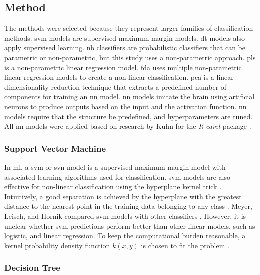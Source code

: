 \let\LaTeXcline\cline\documentclass[sn-mathphys-num]{sn-jnl}\let\cline\LaTeXcline
\begin{document}
\subsection{Method}

The methods were selected because they represent larger families of classification methods. \acrshort{svm} models are supervised maximum margin models. \acrshort{dt} models also apply supervised learning. \acrshort{nb} classifiers are probabilistic classifiers that can be parametric or non-parametric, but this study uses a non-parametric approach. \acrshort{pls} is a non-parametric linear regression model. \acrshort{fda} uses multiple non-parametric linear regression models to create a non-linear classification. \acrshort{pca} is a linear dimensionality reduction technique that extracts a predefined number of components for training an \acrshort{nn} model. \acrshort{nn} models imitate the brain using artificial neurons to produce outputs based on the input and the activation function. \acrshort{nn} models require that the structure be predefined, and hyperparameters are tuned. All \acrshort{nn} models were applied based on research by Kuhn for the \textit{R} \textit{caret} package \cite{Kuhn2007, kuhn2008building, kuhn2013applied}.

\subsubsection{Support Vector Machine}

In \acrlong{ml}, a \acrfull{svm} or \acrfull{svn} model is a supervised maximum margin model with associated learning algorithms used for classification. \acrshort{svm} models are also effective for non-linear classification using the hyperplane kernel trick \cite{Boser1992}. Intuitively, a good separation is achieved by the hyperplane with the greatest distance to the nearest point in the training data belonging to any class \cite{HastieRosset2009}. Meyer, Leisch, and Hornik compared \acrshort{svm} models with other classifiers \cite{Meyer2003}. However, it is unclear whether \acrshort{svm} predictions perform better than other linear models, such as logistic, and linear regression. To keep the computational burden reasonable, a kernel probability density function $k(x, y)$ is chosen to fit the problem \cite{Press2007}.

\subsubsection{Decision Tree}
\end{document}
